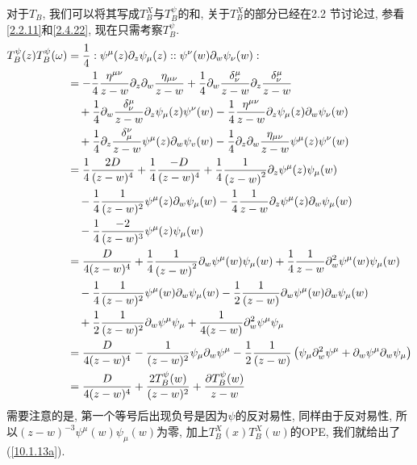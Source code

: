 \begin{tcolorbox}[breakable]
对于$T_{B}$, 我们可以将其写成$T_{B}^{X}$与$T_{B}^{\psi }$的和, 关于$T_{B}^{X}$的部分已经在2.2%
节讨论过, 参看\eqref{2.2.11}和\eqref{2.4.22},
现在只需考察$T_{B}^{\psi }$.%
\begin{align*}
T_{B}^{\psi }(z)T_{B}^{\psi }(\omega ) &=\frac{1}{4}:\psi ^{\mu
}(z)\partial _{z}\psi _{\mu }(z)::\psi ^{\nu }(w)\partial _{w}\psi _{\nu
}(w): \\
&=-\frac{1}{4}\frac{\eta ^{\mu \nu }}{z-w}\partial _{z}\partial _{w}\frac{%
\eta _{\mu \nu }}{z-w}+\frac{1}{4}\partial _{w}\frac{\delta _{\nu }^{\mu }}{%
z-w}\partial _{z}\frac{\delta _{\nu }^{\mu }}{z-w} \\
&\quad+\frac{1}{4}\partial _{w}\frac{\delta _{\nu }^{\mu }}{z-w}\partial
_{z}\psi _{\mu }(z)\psi ^{\nu }(w)-\frac{1}{4}\frac{\eta ^{\mu \nu }}{z-w}%
\partial _{z}\psi _{\mu }(z)\partial _{w}\psi _{\nu }(w) \\
&\quad+\frac{1}{4}\partial _{z}\frac{\delta _{\mu }^{\nu }}{z-w}\psi ^{\mu
}(z)\partial _{w}\psi _{v}(w)-\frac{1}{4}\partial _{z}\partial _{w}\frac{%
\eta _{\mu \nu }}{z-w}\psi ^{\mu }(z)\psi ^{\nu }(w) \\
&=\frac{1}{4}\frac{2D}{(z-w)^{4}}+\frac{1}{4}\frac{-D}{(z-w)^{4}}+\frac{1}{4%
}\frac{1}{\left( z-w\right) ^{2}}\partial _{z}\psi ^{\mu }(z)\psi _{\mu }(w)
\\
&\quad-\frac{1}{4}\frac{1}{(z-w)^{2}}\psi ^{\mu }(z)\partial _{w}\psi _{\mu }(w)-%
\frac{1}{4}\frac{1}{z-w}\partial _{z}\psi ^{\mu }(z)\partial _{w}\psi _{\mu
}(w) \\
&\quad-\frac{1}{4}\frac{-2}{(z-w)^{3}}\psi ^{\mu }(z)\psi _{\mu }(w) \\
&=\frac{D}{4(z-w)^{4}}+\frac{1}{4}\frac{1}{\left( z-w\right) ^{2}}\partial
_{w}\psi ^{\mu }(w)\psi _{\mu }(w)+\frac{1}{4}\frac{1}{z-w}\partial
_{w}^{2}\psi ^{\mu }(w)\psi _{\mu }(w) \\
&\quad-\frac{1}{4}\frac{1}{(z-w)^{2}}\psi ^{\mu }(w)\partial _{w}\psi _{\mu }(w)-%
\frac{1}{2}\frac{1}{(z-w)}\partial _{w}\psi ^{\mu }(w)\partial _{w}\psi
_{\mu }(w) \\
&\quad+\frac{1}{2}\frac{1}{(z-w)^{2}}\partial _{w}\psi ^{\mu }\psi _{\mu
} +\frac{1}{4(z-w)}\partial _{w}^{2}\psi ^{\mu }\psi _{\mu } \\
&=\frac{D}{4(z-w)^{4}}-\frac{1}{(z-w)^{2}}\psi _{\mu }\partial _{w}\psi
^{\mu }-\frac{1}{2}\frac{1}{(z-w)}\left( \psi _{\mu }\partial _{w}^{2}\psi
^{\mu }+\partial _{w}\psi ^{\mu }\partial _{w}\psi _{\mu }\right)  \\
&=\frac{D}{4(z-w)^{4}}+\frac{2T_{B}^{\psi }(w)}{(z-w)^{2}}+\frac{\partial
T_{B}^{\psi }(w)}{z-w}
\end{align*}
需要注意的是, 第一个等号后出现负号是因为$ \psi $的反对易性, 同样由于反对易性, 所以$ (z-w)^{-3}\psi^{\mu}(w)\psi_{\mu}(w) $为零, 加上$T_{B}^{X}(x)T_{B}^{X}(w)$的OPE, 我们就给出了(\ref{10.1.13a}).


\end{tcolorbox}
